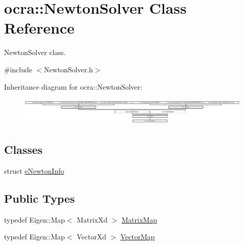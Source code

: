 \hypertarget{classocra_1_1NewtonSolver}{}\section{ocra\+:\+:Newton\+Solver Class Reference}
\label{classocra_1_1NewtonSolver}


Newton\+Solver class.  




{\ttfamily \#include $<$Newton\+Solver.\+h$>$}

Inheritance diagram for ocra\+:\+:Newton\+Solver\+:\begin{figure}[H]
\begin{center}
\leavevmode
\includegraphics[height=1.352657cm]{d2/d07/classocra_1_1NewtonSolver}
\end{center}
\end{figure}
\subsection*{Classes}
\begin{DoxyCompactItemize}
\item 
struct \hyperlink{structocra_1_1NewtonSolver_1_1eNewtonInfo}{e\+Newton\+Info}
\end{DoxyCompactItemize}
\subsection*{Public Types}
\begin{DoxyCompactItemize}
\item 
typedef Eigen\+::\+Map$<$ Matrix\+Xd $>$ \hyperlink{classocra_1_1NewtonSolver_a53e3463c336170efa3819d725c9b16e3}{Matrix\+Map}
\item 
typedef Eigen\+::\+Map$<$ Vector\+Xd $>$ \hyperlink{classocra_1_1NewtonSolver_aad21c090baadce638c9613f4b9d1d5c4}{Vector\+Map}
\end{DoxyCompactItemize}
